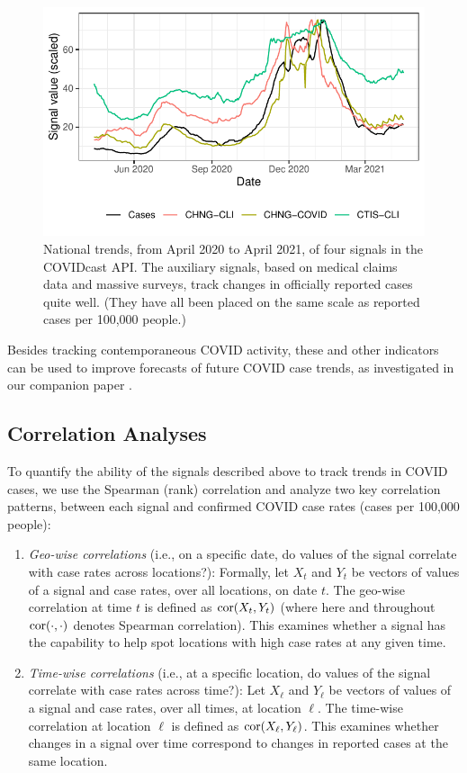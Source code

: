 \documentclass[9pt,twocolumn,twoside,lineno]{pnas-new}
\begin{document}
\begin{figure}[t]
  \includegraphics[width=\columnwidth]{fig/time_trends_national.pdf}
  \caption{National trends, from April 2020 to April 2021, of four signals in
    the COVIDcast API. The auxiliary signals, based on medical claims data and
    massive surveys, track changes in officially reported cases quite
    well. (They have all been placed on the same scale as reported cases per
    100,000 people.)}
  \label{fig:time_trends_national}
\end{figure}

Besides tracking contemporaneous COVID activity, these and other indicators can
be used to improve forecasts of future COVID case trends, as investigated in our
companion paper \cite{McDonald:2021}.

\subsection{Correlation Analyses}

To quantify the ability of the signals described above to track trends in COVID
cases, we use the Spearman (rank) correlation and analyze two key correlation
patterns, between each signal and confirmed COVID case rates (cases per 100,000
people):

\begin{enumerate}
\item \textit{Geo-wise correlations} (i.e., on a specific date, do values of the
  signal correlate with case rates across locations?): Formally, let $X_t$ and
  $Y_t$ be vectors of values of a signal and case rates, over all locations, on
  date $t$. The geo-wise correlation at time $t$ is defined as $\mathrm{cor}(X_t,
  Y_t)$ (where here and throughout $\mathrm{cor}(\cdot,\cdot)$ denotes Spearman
  correlation). This examines whether a signal has the capability to help spot
  locations with high case rates at any given time.

\item \textit{Time-wise correlations} (i.e., at a specific location, do values
  of the signal correlate with case rates across time?): Let $X_\ell$
  and $Y_\ell$ be vectors of values of a signal and case rates, over all
  times, at location $\ell$. The time-wise correlation at location $\ell$ is
  defined as $\mathrm{cor}(X_\ell, Y_\ell)$. This examines whether changes in a signal
  over time correspond to changes in reported cases at the same
  location.
\end{enumerate}
\end{document}
